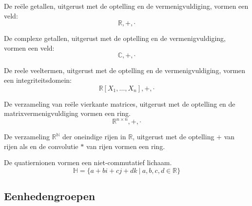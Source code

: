 \documentclass[main.tex]{subfiles}
\begin{document}
\begin{vb}
  De re\"ele getallen, uitgerust met de optelling en de vermenigvuldiging, vormen een veld:
  \[ \mathbb{R},+,\cdot \]
\commj {} \domein \lichaam \veld
\end{vb}

\begin{vb}
  De complexe getallen, uitgerust met de optelling en de vermenigvuldiging, vormen een veld:
  \[ \mathbb{C},+,\cdot \]
  \commj {} \domein \lichaam \veld
\end{vb}

\begin{vb}
  De reele veeltermen, uitgerust met de optelling en de vermenigvuldiging, vormen een integriteitsdomein: 
  \[ \mathbb{R}[X_{1},\dotsc,X_{n}],+,\cdot \]
  \commj {} \domein
\end{vb}

\begin{vb}
  De verzameling van re\"ele vierkante matrices, uitgerust met de optelling en de matrixvermenigvuldiging vormen een ring. 
  \[ \mathbb{R}^{n\times n},+,\cdot \]
  \commn {}
\end{vb}

\begin{vb}
  De verzameling $\mathbb{R}^{\mathbb{N}}$ der oneindige rijen in $\mathbb{R}$, uitgerust met de optelling $+$ van rijen als en de convolutie $*$ van rijen vormen een ring.\\
   \commj
\end{vb}

\begin{vb}
  \[
  \left\{
    \begin{pmatrix}
      r & 0\\
      0 & 0
    \end{pmatrix}
    \ |\
    r \in \mathbb{Z}
  \right\},+,\cdot
  \]
  \commj {}$} \domein
\end{vb}

\begin{vb}
  De quatiernionen vormen een niet-commutatief lichaam.
  \[ \mathbb{H} = \{ a + bi + cj + dk \ |\ a,b,c,d \in \mathbb{R} \} \]
  \commn \eenhj{$1$} \lichaam 
\end{vb}

\subsection{Eenhedengroepen}
\label{sec:eenhedengroepen}
\end{document}
